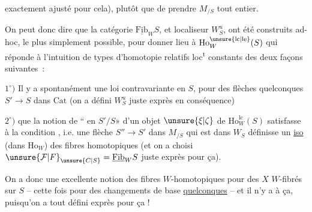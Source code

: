 
exactement ajusté pour cela), plutôt que de prendre $M_{/S}$ tout entier.

On peut donc dire que la catégorie $\underline{\mathrm{Fib}}_W S$, et  localiseur $W_S^u$, ont été construits ad-hoc, le plus simplement possible, pour donner lieu à  $\mathrm{Ho}^{\unsure{\mathrm{lc}|\mathrm{le}}}_W(S)$ qui  réponde à l'intuition de types d'homotopie relatifs loc\textsuperscript{t} constants des deux façons suivantes~:

$1^{\circ})$ Il y a spontanément une loi contravariante en $S$, pour des flèches quelconques  $S'\to S$ dans $\mathrm{Cat}$ (on a défini $W_S^u$ juste exprès en conséquence)

$2^{\circ})$ que la notion de ``  en $S'/S$» d'un objet $\unsure{\xi|\zeta}$ de $\mathrm{Ho}^{\mathrm{lc}}_W(S)$ satisfasse à la condition , i.e. une flèche $S''\to S'$ dans $M_{/S}$ qui est dans $W_S$ définisse un \uline{iso} (dans $\mathrm{Ho}_W$) des fibres homotopiques
(et on a choisi $\unsure{\mathcal{F}|F}_{\unsure{C|S}}=\underline{\mathrm{Fib}}_W S$ juste exprès pour ça).

On a donc une excellente notion des fibres $W$-homotopiques pour des $X$ $W$-fibrés sur $S$ -- cette fois  pour des changements de base \uline{quelconques} -- et il n'y a  à ça, puisqu'on a tout défini exprès pour ça !

